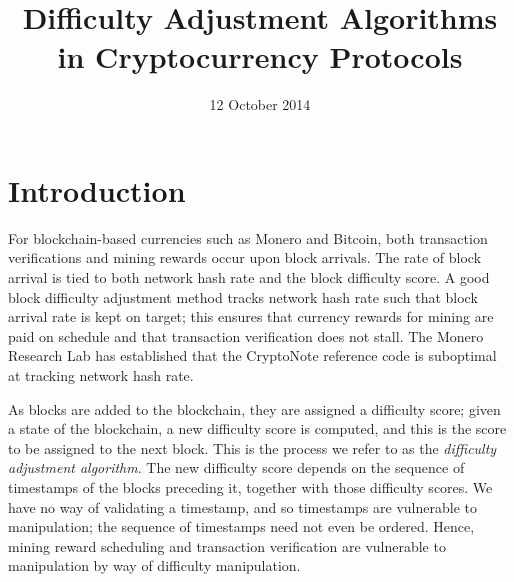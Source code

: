 \documentclass[12pt,english]{mrl}
\theoremstyle{definition}
\numberwithin{equation}{section}
\numberwithin{figure}{section}
\numberwithin{equation}{section}
\numberwithin{equation}{section}
\numberwithin{figure}{section}
\begin{document}
\begin{frontmatter}

\begin{fmbox}
\hfill\setlength{\fboxrule}{0px}\setlength{\fboxsep}{5px}
\title{Difficulty Adjustment Algorithms in Cryptocurrency Protocols}
\date{12 October 2014}
\author[
   addressref={mrl},
   email={lab@monero.cc}
]{ }
\author[
   addressref={mrl}
   email={lab@monero.cc}
]{ }


\address[id=mrl]{
}
\end{fmbox}

\begin{abstractbox}
\begin{abstract}


\end{abstract}
\end{abstractbox}
\end{frontmatter}

\section{Introduction}\label{intro}

For blockchain-based currencies such as Monero and Bitcoin, both transaction verifications and mining rewards occur upon block arrivals. The rate of block arrival is tied to both network hash rate and the block difficulty score. A good block difficulty adjustment method tracks network hash rate such that block arrival rate is kept on target; this ensures that currency rewards for mining are paid on schedule and that transaction verification does not stall. The Monero Research Lab has established that the CryptoNote reference code is suboptimal at tracking network hash rate.

As blocks are added to the blockchain, they are assigned a difficulty score; given a state of the blockchain, a new difficulty score is computed, and this is the score to be assigned to the next block. This is the process we refer to as the \textit{difficulty adjustment algorithm}. The new difficulty score depends on the sequence of timestamps of the blocks preceding it, together with those difficulty scores.  We have no way of validating a timestamp, and so timestamps are vulnerable to manipulation; the sequence of timestamps need not even be ordered. Hence, mining reward scheduling and transaction verification are vulnerable to manipulation by way of difficulty manipulation.  
\end{document}
